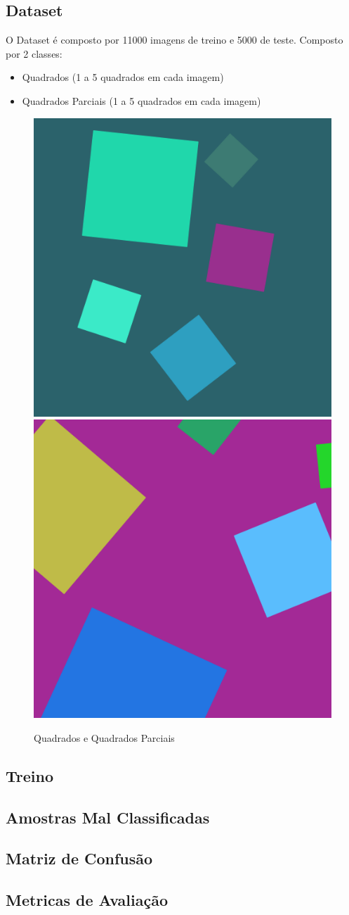 \subsection{Dataset}
O Dataset é composto por 11000 imagens de treino e 5000 de teste. Composto por 2 classes: 
\begin{itemize}
    \item Quadrados (1 a 5 quadrados em cada imagem)
    \item Quadrados Parciais  (1 a 5 quadrados em cada imagem)
\end{itemize}

\begin{figure}[H]
    \centering
    \includegraphics[width=0.35\linewidth]{imgs/Test_5/5_1/dataset/square_5.png}
    \includegraphics[width=0.35\linewidth]{imgs/Test_5/5_1/dataset/square_cut_6.png}
    \caption{Quadrados e Quadrados Parciais}
    \label{fig:enter-label}
\end{figure}
\subsection{Treino}
\subsection{Amostras Mal Classificadas}
\subsection{Matriz de Confusão}
\subsection{Metricas de Avaliação}
